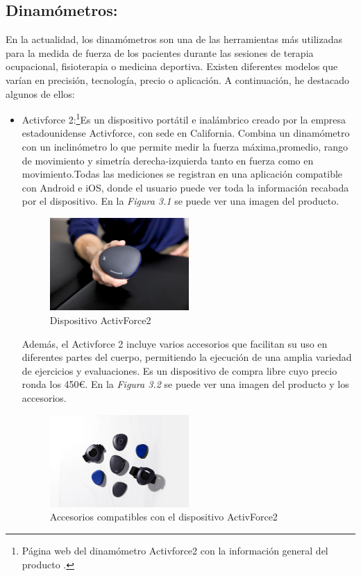 \subsection{Dinamómetros:}
En la actualidad, los dinamómetros son una de las herramientas más utilizadas  para la medida de fuerza de los pacientes durante las sesiones de terapia ocupacional, fisioterapia o medicina deportiva. Existen diferentes modelos que varían en precisión, tecnología, precio o aplicación. 
A continuación, he destacado algunos de ellos:
\begin{itemize}
    \item Activforce 2:\cite{activforce}\footnote{Página web del dinamómetro Activforce2 con la información general del producto \cite{activforce}.}Es un dispositivo portátil e inalámbrico creado por la empresa estadounidense Activforce, con sede en California. Combina un dinamómetro con un inclinómetro lo que permite medir la fuerza máxima,promedio, rango de movimiento y simetría derecha-izquierda tanto en fuerza como en movimiento.Todas las mediciones se registran en una aplicación compatible con Android e iOS, donde el usuario puede ver toda la información recabada por el dispositivo. En la \textit{Figura 3.1} se puede ver una imagen del producto.
    \begin{figure}[h]
        \centering
        \includegraphics[width=0.5\textwidth]{img/ActivForce_Device.jpg}
        \caption{Dispositivo ActivForce2}
        \label{fig:activforce}
    \end{figure}
    
    Además, el Activforce 2 incluye varios accesorios que facilitan su uso en diferentes partes del cuerpo, permitiendo la ejecución de una amplia variedad de ejercicios y evaluaciones. Es un dispositivo de compra libre cuyo precio ronda los 450€. En la \textit{Figura 3.2} se puede ver una imagen del producto y los accesorios.
    \begin{figure}[h]
        \centering
        \includegraphics[width=0.5\textwidth]{img/ActivForce_Attachments.jpg}
        \caption{Accesorios compatibles con el dispositivo ActivForce2}
        \label{fig:activforce}
    \end{figure}


\end{itemize}
